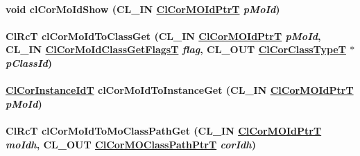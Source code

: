 \hypertarget{group__group13_ga114}{
\paragraph[clCorMoIdShow]{\setlength{\rightskip}{0pt plus 5cm}void cl\-Cor\-Mo\-Id\-Show (CL\_\-IN \hyperlink{struct_cl_cor_m_o_id}{Cl\-Cor\-MOId\-Ptr\-T} {\em p\-Mo\-Id})}\hfill}
\label{group__group13_ga114}


\hypertarget{group__group13_ga115}{
\paragraph[clCorMoIdToClassGet]{\setlength{\rightskip}{0pt plus 5cm}Cl\-Rc\-T cl\-Cor\-Mo\-Id\-To\-Class\-Get (CL\_\-IN \hyperlink{struct_cl_cor_m_o_id}{Cl\-Cor\-MOId\-Ptr\-T} {\em p\-Mo\-Id}, CL\_\-IN \hyperlink{group__group13_ga332}{Cl\-Cor\-Mo\-Id\-Class\-Get\-Flags\-T} {\em flag}, CL\_\-OUT \hyperlink{group__group13_ga2}{Cl\-Cor\-Class\-Type\-T} $\ast$ {\em p\-Class\-Id})}\hfill}
\label{group__group13_ga115}


\hypertarget{group__group13_ga121}{
\paragraph[clCorMoIdToInstanceGet]{\setlength{\rightskip}{0pt plus 5cm}\hyperlink{group__group13_ga4}{Cl\-Cor\-Instance\-Id\-T} cl\-Cor\-Mo\-Id\-To\-Instance\-Get (CL\_\-IN \hyperlink{struct_cl_cor_m_o_id}{Cl\-Cor\-MOId\-Ptr\-T} {\em p\-Mo\-Id})}\hfill}
\label{group__group13_ga121}


\hypertarget{group__group13_ga122}{
\paragraph[clCorMoIdToMoClassPathGet]{\setlength{\rightskip}{0pt plus 5cm}Cl\-Rc\-T cl\-Cor\-Mo\-Id\-To\-Mo\-Class\-Path\-Get (CL\_\-IN \hyperlink{struct_cl_cor_m_o_id}{Cl\-Cor\-MOId\-Ptr\-T} {\em mo\-Idh}, CL\_\-OUT \hyperlink{struct_cl_cor_m_o_class_path}{Cl\-Cor\-MOClass\-Path\-Ptr\-T} {\em cor\-Idh})}\hfill}
\label{group__group13_ga122}


